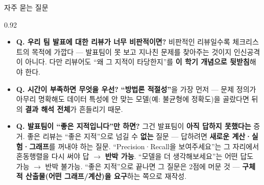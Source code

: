 \begin{frame}{자주 묻는 질문}
\begin{center}\begin{varwidth}{0.92\textwidth}
  \begin{itemize}
    \item \textbf{Q. 우리 팀 발표에 대한 리뷰가 너무 비판적이면?}
      비판적인 리뷰일수록 체크리스트의 목적에 가깝다 ---
      발표팀이 못 보고 지나친 문제를 찾아주는 것이지 인신공격
      이 아니다. 다만 리뷰어도 ``왜 그 지적이 타당한지''를
      \textbf{이 학기 개념으로 뒷받침}해야 한다.
    \item \textbf{Q. 시간이 부족하면 무엇을 우선?}
      \textbf{``방법론 적절성''}을 가장 먼저 --- 문제 정의가
      아무리 명확해도 데이터 특성에 안 맞는 모델(예: 불균형에
      정확도)을 골랐다면 뒤의 \textbf{결과 해석 전체}가
      흔들리기 때문.
    \item \textbf{Q. 발표팀이 ``좋은 지적입니다''만 하면?}
      그건 발표팀이 \textbf{아직 답하지 못했다는} 증거. 좋은
      리뷰는 ``좋은 지적''으로 넘길 수 \textbf{없는} 질문 ---
      답하려면 \textbf{새로운 계산·실험·그래프}를 꺼내야 하는
      질문. ``Precision·Recall을 보여주세요''는 그 자리에서
      혼동행렬을 다시 써야 답 $\to$ \textbf{반박 가능}.
      ``모델을 더 생각해보세요''는 어떤 답도 가능 $\to$ 반박
      불가능. ``좋은 지적''으로 끝나면 그 질문은 2점에 머문
      것 --- \textbf{구체적 산출물(어떤 그래프/계산)을 요구}하는
      쪽으로 재작성.
  \end{itemize}
\end{varwidth}\end{center}
\end{frame}
